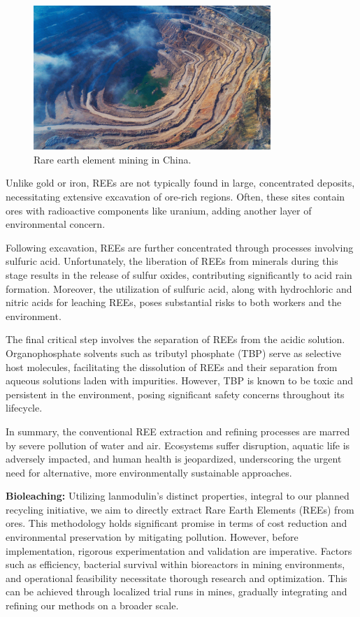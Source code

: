 \begin{figure}[H]
    \centering
    \includegraphics[width=0.8\textwidth]{./media/images/ree_mining_china}
    \caption{Rare earth element mining in China.}
    \label{fig:ree_mining_china}
\end{figure}

Unlike gold or iron, REEs are not typically found in large, concentrated deposits, necessitating
extensive excavation of ore-rich regions. Often, these sites contain ores with radioactive components
like uranium, adding another layer of environmental concern.

Following excavation, REEs are further concentrated through processes involving sulfuric acid.
Unfortunately, the liberation of REEs from minerals during this stage results in the release of sulfur
oxides, contributing significantly to acid rain formation. Moreover, the utilization of sulfuric acid,
along with hydrochloric and nitric acids for leaching REEs, poses substantial risks to both workers and
the environment.

The final critical step involves the separation of REEs from the acidic solution. Organophosphate
solvents such as tributyl phosphate (TBP) serve as selective host molecules, facilitating the dissolution
of REEs and their separation from aqueous solutions laden with impurities. However, TBP is known to
be toxic and persistent in the environment, posing significant safety concerns throughout its lifecycle.

In summary, the conventional REE extraction and refining processes are marred by severe pollution of
water and air. Ecosystems suffer disruption, aquatic life is adversely impacted, and human health is
jeopardized, underscoring the urgent need for alternative, more environmentally sustainable
approaches.

\textbf{Bioleaching:}
Utilizing lanmodulin's distinct properties, integral to our planned recycling initiative, we aim to
directly extract Rare Earth Elements (REEs) from ores. This methodology holds significant promise in
terms of cost reduction and environmental preservation by mitigating pollution. However, before
implementation, rigorous experimentation and validation are imperative. Factors such as efficiency,
bacterial survival within bioreactors in mining environments, and operational feasibility necessitate
thorough research and optimization. This can be achieved through localized trial runs in mines,
gradually integrating and refining our methods on a broader scale.